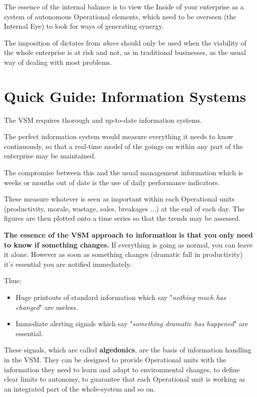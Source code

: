 The essence of the internal balance is to view the Inside of your enterprise as a system of autonomous Operational elements, which need to be overseen (the Internal Eye) to look for ways of generating synergy.

The imposition of dictates from \textit{above} should only be used when the viability of the whole enterprise is at risk and not, as in traditional businesses, as the usual way of dealing with most problems.

\section*{Quick Guide: Information Systems}
The VSM requires thorough and up-to-date information systems.

The perfect information system would measure everything it needs to know continuously, so that a real-time model of the goings on within any part of the enterprise may be maintained.

The compromise between this and the usual management information which is weeks or months out of date is the use of daily performance indicators.

These measure whatever is seen as important within each Operational units (productivity, morale, wastage, sales, breakages ...) at the end of each day. The figures are then plotted onto a time series so that the trends may be assessed.

\textbf{The essence of the VSM approach to information is that you only need to know if something changes.} If everything is going as normal, you can leave it alone. However as soon as something changes (dramatic fall in productivity) it's essential you are notified immediately.

Thus:

\begin{itemize}
  \item Huge printouts of standard information which say "\textit{nothing much has changed}" are useless.

  \item Immediate alerting signals which say "\textit{something dramatic has happened}" are essential.

\end{itemize}

These signals, which are called \textbf{algedonics}, are the basis of information handling in the VSM. They can be designed to provide Operational units with the information they need to learn and adapt to environmental changes, to define clear limits to autonomy, to guarantee that each Operational unit is working as an integrated part of the whole-system and so on.

